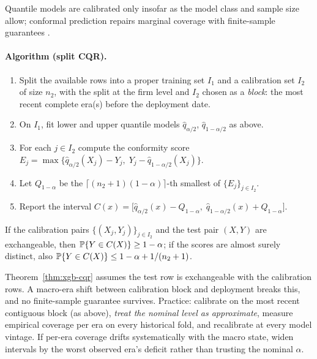 Quantile models are calibrated only insofar as the model class and sample size allow;
conformal prediction repairs marginal coverage with finite-sample guarantees
\cite{romano2019}.

\paragraph{Algorithm (split CQR).}
\begin{enumerate}
\item Split the available rows into a proper training set $I_1$ and a calibration set
$I_2$ of size $n_2$, with the split at the firm level and $I_2$ chosen as a
\emph{block}: the most recent complete era(s) before the deployment date.
\item On $I_1$, fit lower and upper quantile models $\hat q_{\alpha/2}$,
$\hat q_{1-\alpha/2}$ as above.
\item For each $j \in I_2$ compute the conformity score
$E_j = \max\bigl\{\hat q_{\alpha/2}(X_j) - Y_j,\; Y_j - \hat q_{1-\alpha/2}(X_j)\bigr\}$.
\item Let $Q_{1-\alpha}$ be the $\lceil (n_2+1)(1-\alpha) \rceil$-th smallest of
$\{E_j\}_{j \in I_2}$.
\item Report the interval
$C(x) = \bigl[\hat q_{\alpha/2}(x) - Q_{1-\alpha},\;
\hat q_{1-\alpha/2}(x) + Q_{1-\alpha}\bigr]$.
\end{enumerate}

\begin{theorem}
\label{thm:xgb-cqr}
If the calibration pairs $\{(X_j, Y_j)\}_{j \in I_2}$ and the test pair $(X, Y)$ are
exchangeable, then $\mathbb{P}\{Y \in C(X)\} \ge 1 - \alpha$; if the scores are almost surely
distinct, also $\mathbb{P}\{Y \in C(X)\} \le 1 - \alpha + 1/(n_2 + 1)$.
\end{theorem}

\begin{warning}
\label{warn:xgb-exch}
Theorem~\ref{thm:xgb-cqr} assumes the test row is exchangeable with the calibration
rows. A macro-era shift between calibration block and deployment breaks this, and no
finite-sample guarantee survives. Practice: calibrate on the most recent contiguous
block (as above), \emph{treat the nominal level as approximate}, measure empirical
coverage per era on every historical fold, and recalibrate at every model vintage. If
per-era coverage drifts systematically with the macro state, widen intervals by the
worst observed era's deficit rather than trusting the nominal $\alpha$.
\end{warning}

